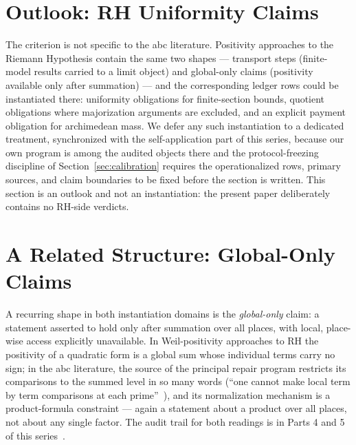 \documentclass[11pt,a4paper]{article}
\begin{document}
\section{Outlook: RH Uniformity Claims}\label{sec:rh}

The criterion is not specific to the abc literature. Positivity approaches
to the Riemann Hypothesis contain the same two shapes --- transport steps
(finite-model results carried to a limit object) and global-only claims
(positivity available only after summation) --- and the corresponding
ledger rows could be instantiated there: uniformity obligations for
finite-section bounds, quotient obligations where majorization arguments
are excluded, and an explicit payment obligation for archimedean mass. We
defer any such instantiation to a dedicated treatment, synchronized with the
self-application part of this series, because our own program is among
the audited objects there and the protocol-freezing discipline of
Section~\ref{sec:calibration} requires the operationalized rows, primary
sources, and claim boundaries to be fixed before the section is written.
This section is an outlook and not an instantiation: the present paper
deliberately contains no RH-side verdicts.

\section{A Related Structure: Global-Only Claims}\label{sec:global}

A recurring shape in both instantiation domains is the \emph{global-only}
claim: a statement asserted to hold only after summation over all places,
with local, place-wise access explicitly unavailable. In Weil-positivity
approaches to RH the positivity of a quadratic form is a global sum whose
individual terms carry no sign; in the abc literature, the source of the
principal repair program restricts its comparisons to the summed level in
so many words (``one cannot make local term by term comparisons at each
prime''~\cite{JoshiATSIII,JoshiATSIV}), and its normalization mechanism is a
product-formula constraint --- again a statement about a product over all
places, not about any single factor. The audit trail for both readings is in
Parts 4 and 5 of this series~\cite{part4,part5}.
\end{document}
